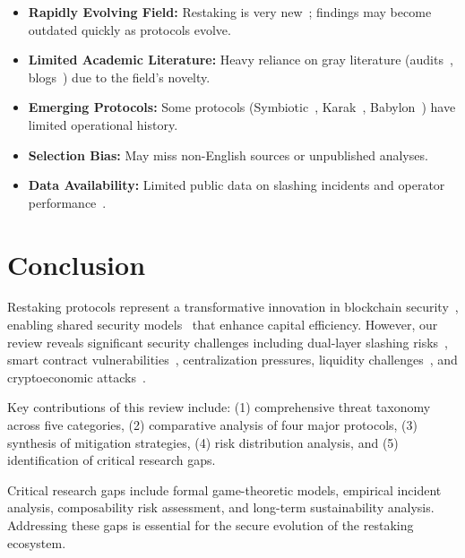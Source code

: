 \documentclass[runningheads]{llncs}
\begin{document}
\begin{itemize}
    \item \textbf{Rapidly Evolving Field:} Restaking is very new~\cite{eigenlayer2024}; findings may become outdated quickly as protocols evolve.
    \item \textbf{Limited Academic Literature:} Heavy reliance on gray literature (audits~\cite{certora2025,code4rena2023,trailofbits2024}, blogs~\cite{blocksec2024,cobo2024,okx2024}) due to the field's novelty.
    \item \textbf{Emerging Protocols:} Some protocols (Symbiotic~\cite{symbiotic2024}, Karak~\cite{karak2024}, Babylon~\cite{babylon2024}) have limited operational history.
    \item \textbf{Selection Bias:} May miss non-English sources or unpublished analyses.
    \item \textbf{Data Availability:} Limited public data on slashing incidents and operator performance~\cite{ethereum2024staking}.
\end{itemize}

\vspace{-0.3cm}
\section{Conclusion}
\label{sec:conclusion}

Restaking protocols represent a transformative innovation in blockchain security~\cite{eigenlayer2024,symbiotic2024,karak2024,babylon2024}, enabling shared security models~\cite{wood2021polkadot} that enhance capital efficiency. However, our review reveals significant security challenges including dual-layer slashing risks~\cite{durvasula2024robust}, smart contract vulnerabilities~\cite{certora2025,code4rena2023}, centralization pressures, liquidity challenges~\cite{trailofbits2023staking}, and cryptoeconomic attacks~\cite{zhou2020high,chen2021sok}.

Key contributions of this review include: (1) comprehensive threat taxonomy across five categories, (2) comparative analysis of four major protocols, (3) synthesis of mitigation strategies, (4) risk distribution analysis, and (5) identification of critical research gaps.

Critical research gaps include formal game-theoretic models, empirical incident analysis, composability risk assessment, and long-term sustainability analysis. Addressing these gaps is essential for the secure evolution of the restaking ecosystem.
\end{document}
